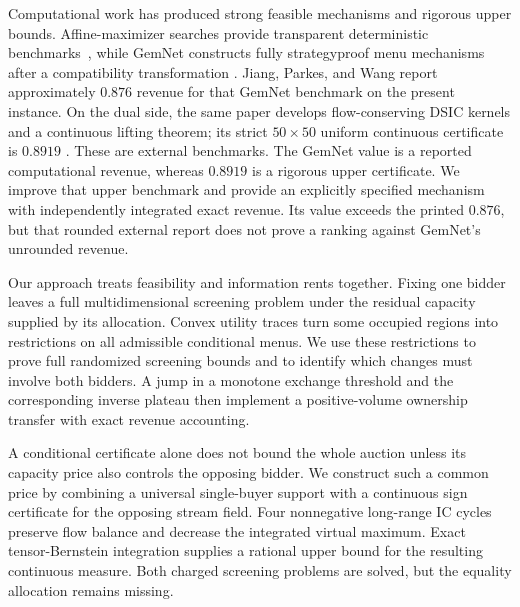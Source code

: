\documentclass[11pt]{article}
\begin{document}
Computational work has produced strong feasible mechanisms and rigorous upper
bounds.  Affine-maximizer searches provide transparent deterministic
benchmarks~\citep{sandholm2015}, while GemNet constructs fully
strategyproof menu mechanisms after a compatibility transformation
\citep{wang2024gemnet}.  Jiang, Parkes, and Wang report approximately $0.876$
revenue for that GemNet benchmark on the present instance.  On the dual side,
the same paper develops flow-conserving DSIC kernels and a continuous lifting
theorem; its strict $50\times50$ uniform continuous certificate is $0.8919$
\citep{jiang2026duality}.  These are external benchmarks.  The GemNet value is
a reported computational revenue, whereas $0.8919$ is a rigorous upper
certificate. We improve that upper benchmark and provide an explicitly
specified mechanism with independently integrated exact revenue. Its value
exceeds the printed $0.876$, but that rounded external report does not prove
a ranking against GemNet's unrounded revenue.

Our approach treats feasibility and information rents together. Fixing one
bidder leaves a full multidimensional screening problem under the residual
capacity supplied by its allocation. Convex utility traces turn some occupied
regions into restrictions on all admissible conditional menus. We use these
restrictions to prove full randomized screening bounds and to identify which
changes must involve both bidders. A jump in a monotone exchange threshold
and the corresponding inverse plateau then implement a positive-volume
ownership transfer with exact revenue accounting.

A conditional certificate alone does not bound the whole auction unless
its capacity price also controls the opposing bidder. We construct such a
common price by combining a universal single-buyer support with a continuous
sign certificate for the opposing stream field. Four nonnegative long-range
IC cycles preserve flow balance and decrease the integrated virtual maximum.
Exact tensor-Bernstein integration supplies a rational upper bound for the
resulting continuous measure. Both charged screening problems are solved,
but the equality allocation remains missing.
\end{document}
